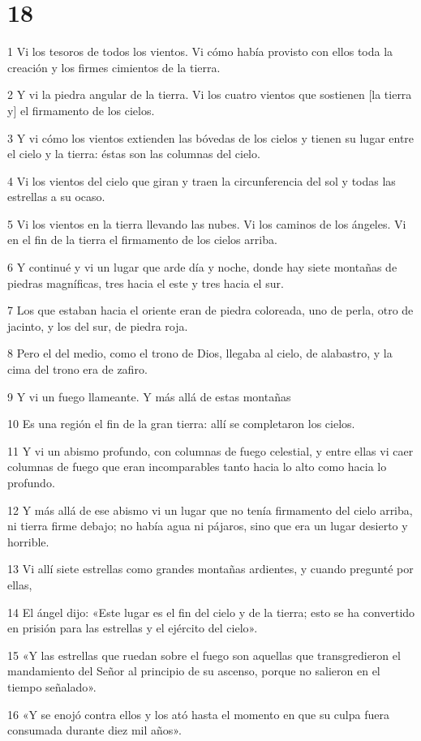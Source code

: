 \chapter{18}

\par 1 Vi los tesoros de todos los vientos. Vi cómo había provisto con ellos toda la creación y los firmes cimientos de la tierra.
\par 2 Y vi la piedra angular de la tierra. Vi los cuatro vientos que sostienen [la tierra y] el firmamento de los cielos.
\par 3 Y vi cómo los vientos extienden las bóvedas de los cielos y tienen su lugar entre el cielo y la tierra: éstas son las columnas del cielo.
\par 4 Vi los vientos del cielo que giran y traen la circunferencia del sol y todas las estrellas a su ocaso.
\par 5 Vi los vientos en la tierra llevando las nubes. Vi los caminos de los ángeles. Vi en el fin de la tierra el firmamento de los cielos arriba.
\par 6 Y continué y vi un lugar que arde día y noche, donde hay siete montañas de piedras magníficas, tres hacia el este y tres hacia el sur.
\par 7 Los que estaban hacia el oriente eran de piedra coloreada, uno de perla, otro de jacinto, y los del sur, de piedra roja.
\par 8 Pero el del medio, como el trono de Dios, llegaba al cielo, de alabastro, y la cima del trono era de zafiro.
\par 9 Y vi un fuego llameante. Y más allá de estas montañas
\par 10 Es una región el fin de la gran tierra: allí se completaron los cielos.
\par 11 Y vi un abismo profundo, con columnas de fuego celestial, y entre ellas vi caer columnas de fuego que eran incomparables tanto hacia lo alto como hacia lo profundo.
\par 12 Y más allá de ese abismo vi un lugar que no tenía firmamento del cielo arriba, ni tierra firme debajo; no había agua ni pájaros, sino que era un lugar desierto y horrible.
\par 13 Vi allí siete estrellas como grandes montañas ardientes, y cuando pregunté por ellas,
\par 14 El ángel dijo: «Este lugar es el fin del cielo y de la tierra; esto se ha convertido en prisión para las estrellas y el ejército del cielo».
\par 15 «Y las estrellas que ruedan sobre el fuego son aquellas que transgredieron el mandamiento del Señor al principio de su ascenso, porque no salieron en el tiempo señalado».
\par 16 «Y se enojó contra ellos y los ató hasta el momento en que su culpa fuera consumada durante diez mil años».

